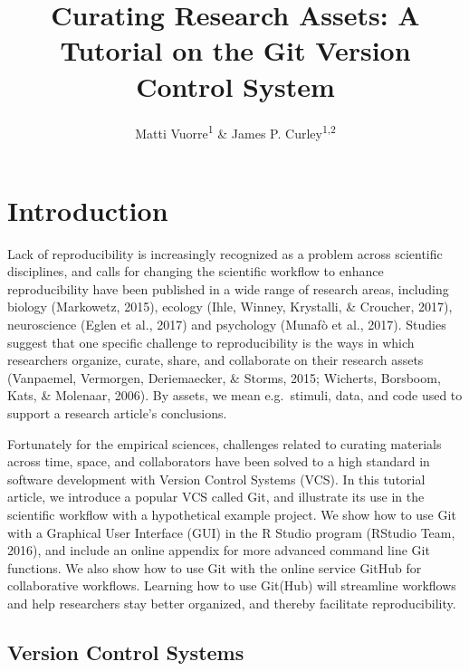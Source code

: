 \documentclass[
  american,
  ,doc,floatsintext]{apa6}
\title{Curating Research Assets: A Tutorial on the Git Version Control System}
\author{Matti Vuorre\textsuperscript{1} \& James P. Curley\textsuperscript{1,2}}
\date{}
\affiliation{\vspace{0.5cm}\textsuperscript{1} Department of Psychology, Columbia University, New York, USA\\\textsuperscript{2} Department of Psychology, University of Texas at Austin, Texas, USA}
\begin{document}
\maketitle

\newpage

\hypertarget{introduction}{%
\section{Introduction}\label{introduction}}

Lack of reproducibility is increasingly recognized as a problem across scientific disciplines, and calls for changing the scientific workflow to enhance reproducibility have been published in a wide range of research areas, including biology (Markowetz, 2015), ecology (Ihle, Winney, Krystalli, \& Croucher, 2017), neuroscience (Eglen et al., 2017) and psychology (Munafò et al., 2017). Studies suggest that one specific challenge to reproducibility is the ways in which researchers organize, curate, share, and collaborate on their research assets (Vanpaemel, Vermorgen, Deriemaecker, \& Storms, 2015; Wicherts, Borsboom, Kats, \& Molenaar, 2006). By assets, we mean e.g.~stimuli, data, and code used to support a research article's conclusions.

Fortunately for the empirical sciences, challenges related to curating materials across time, space, and collaborators have been solved to a high standard in software development with Version Control Systems (VCS). In this tutorial article, we introduce a popular VCS called Git, and illustrate its use in the scientific workflow with a hypothetical example project. We show how to use Git with a Graphical User Interface (GUI) in the R Studio program (RStudio Team, 2016), and include an online appendix for more advanced command line Git functions. We also show how to use Git with the online service GitHub for collaborative workflows. Learning how to use Git(Hub) will streamline workflows and help researchers stay better organized, and thereby facilitate reproducibility.

\hypertarget{version-control-systems}{%
\subsection{Version Control Systems}\label{version-control-systems}}
\end{document}
